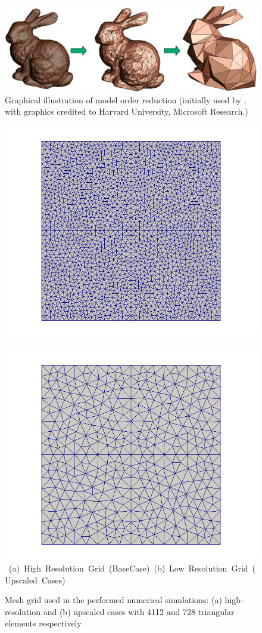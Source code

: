 

\begin{figure}[ht] 
\vbox{\vspace{-1cm}
\centering
\includegraphics[width=.56\textwidth]{./Pics/Introduction/Graphical-illustration-of-model-order-reduction.png}
\vspace{0.cm}
\vspace{0.5cm}
}   
\caption{Graphical illustration of model order reduction (initially used by \citet{Schilders2008}, with graphics credited to Harvard University, Microsoft Research.)}
\vspace{1.5cm}
\label{fig:IllustrationMOR}
\end{figure}

\begin{figure}[ht] 
\vbox{\vspace{-1cm}
\hbox{\includegraphics[width=.56\textwidth]{./Pics/BaseCase/BaseCase_MeshOnly.png}
      \includegraphics[width=.56\textwidth]{./Pics/ArithMeanCase/ArithMeanCase_MeshOnly.png}}
\vspace{0.cm}
\hbox{\hspace{0.25cm} (a) High Resolution Grid (BaseCase) \hspace{0.75cm} (b) Low Resolution Grid (Upscaled Cases) \hspace{3.0cm}}
\vspace{0.5cm}
}   
\caption{Mesh grid used in the performed numerical simulations: (a) high-resolution and (b) upscaled cases with 4112 and 728 triangular elements respectively}
\label{fig:HiRes_LowRes_Mesh}
\end{figure}


